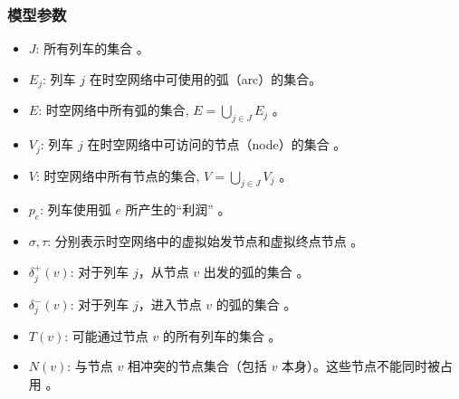 \documentclass{article}
\begin{document}
\subsubsection{模型参数}
\begin{itemize}
    \item $J$: 所有列车的集合 。
    \item $E_j$: 列车 $j$ 在时空网络中可使用的弧（arc）的集合。
    \item $E$: 时空网络中所有弧的集合, $E = \bigcup_{j \in J} E_j$ 。
    \item $V_j$: 列车 $j$ 在时空网络中可访问的节点（node）的集合 。
    \item $V$: 时空网络中所有节点的集合, $V = \bigcup_{j \in J} V_j$ 。
    \item $p_e$: 列车使用弧 $e$ 所产生的“利润” 。
    \item $\sigma, \tau$: 分别表示时空网络中的虚拟始发节点和虚拟终点节点 。
    \item $\delta_j^+(v)$: 对于列车 $j$，从节点 $v$ 出发的弧的集合 。
    \item $\delta_j^-(v)$: 对于列车 $j$，进入节点 $v$ 的弧的集合 。
    \item $T(v)$: 可能通过节点 $v$ 的所有列车的集合 。
    \item $N(v)$: 与节点 $v$ 相冲突的节点集合（包括 $v$ 本身）。这些节点不能同时被占用 。
\end{itemize}
\end{document}
